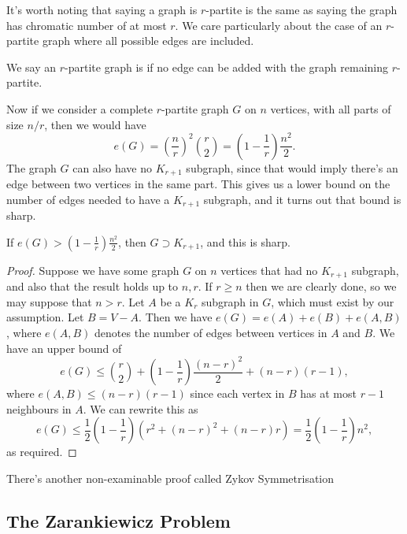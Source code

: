 \documentclass[a4paper]{scrartcl}
\begin{document}
It's worth noting that saying a graph is $r$-partite is the same as saying the graph has chromatic number of at most $r$.
We care particularly about the case of an $r$-partite graph where all possible edges are included.

\begin{definition}
    We say an $r$-partite graph is  if no edge can be added with the graph remaining $r$-partite.
\end{definition}

Now if we consider a complete $r$-partite graph $G$ on $n$ vertices, with all parts of size $n/r$, then we would have 
$$e(G) = \left(\frac{n}{r}\right)^2\binom{r}{2} = \left(1 - \frac{1}{r}\right)\frac{n^2}{2}.$$
The graph $G$ can also have no $K_{r+1}$ subgraph, since 
that would imply there's an edge between two vertices in the same part. This gives us a lower bound on the number of edges needed to have a $K_{r+1}$ subgraph, and it turns out that bound is sharp.

\begin{theorem}
    If $e(G) > \left(1 - \frac{1}{r}\right)\frac{n^2}{2}$, then $G \supset K_{r+1}$, and this is sharp.
\end{theorem}
\begin{proof}
    Suppose we have some graph $G$ on $n$ vertices that had no $K_{r + 1}$ subgraph, and also that the result holds up to $n, r$.
    If $r \geq n$ then we are clearly done, so we may suppose that $n > r$. Let $A$ be a $K_r$ subgraph in $G$, which must exist by our assumption. Let $B = V-A$. Then we have $e(G) = e(A) + e(B) + e(A, B)$, where $e(A, B)$ denotes the number of edges between vertices in $A$ and $B$. We have an upper bound of
    $$
    e(G) \leq \binom{r}{2} + \left(1 - \frac{1}{r}\right)\frac{(n - r)^2}{2} + (n - r)(r - 1),
    $$
    where $e(A, B) \leq (n - r)(r - 1)$ since each vertex in $B$ has at most $r - 1$ neighbours in $A$. We can rewrite this as
    $$
    e(G) \leq \frac{1}{2}\left(1 - \frac{1}{r}\right)(r^2 + (n - r)^2 + (n - r)r) = \frac{1}{2}\left(1 - \frac{1}{r}\right)n^2,
    $$
    as required.
\end{proof}

There's another non-examinable proof called Zykov Symmetrisation


\subsection{The Zarankiewicz Problem}
\end{document}

